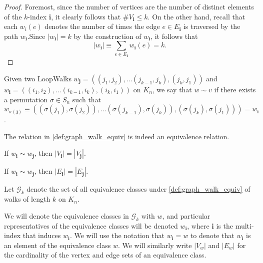 \begin{proof}
  Foremost, since the number of vertices
  are the number of distinct elements of the $k$-index $\mathbf{i}$, it clearly follows that $\#V_\mathbf{i} \leq k$.
  On the other hand, recall that each $w_i(e)$ denotes the number of times the edge $e \in E_\mathbf{i}$
  is traversed by the path $w_\mathbf{i}$.Since $|w_\mathbf{i}| = k$ by the construction of $w_\mathbf{i}$, it follows that
  \[
  |w_\mathbf{i}| \equiv \sum_{e \in E_\mathbf{i}} w_\mathbf{i}(e) = k.
  \]
\end{proof}


\begin{definition}
  \label{def:graph_walk_equiv}
  Given two LoopWalks $w_{\mathbf{j}} = ((j_1, j_2), \dots (j_{k-1}, j_k), (j_k, j_1))$ and
  $w_{\mathbf{i}}=((i_1, i_2), \dots (i_{k-1}, i_k), (i_k, i_1))$
   on $K_n$, we say that $w \sim v$ if there exists a permutation $\sigma \in S_n$ such that
   $w_{\sigma(\mathbf{j})} \equiv ((\sigma(j_1), \sigma(j_2)), \dots (\sigma(j_{k-1}), \sigma(j_k)), (\sigma(j_{k}), \sigma(j_1)))
   = w_{\mathbf{i}}$.
\end{definition}


\begin{lemma}
  \label{lem:graph_walk_equiv}
  The relation in \ref{def:graph_walk_equiv} is indeed an equivalence relation.
\end{lemma}


\begin{lemma}
  \label{lem:walk_vertex_card_equiv}
  If $w_{\mathbf{i}} \sim w_{\mathbf{j}}$, then $|V_{\mathbf{i}}| = |V_{\mathbf{j}}|$.
\end{lemma}


\begin{lemma}
  \label{lem:walk_edge_card_equiv}
  If $w_{\mathbf{i}} \sim w_{\mathbf{j}}$, then $|E_{\mathbf{i}}| = |E_{\mathbf{j}}|$.
\end{lemma}


\begin{definition}
  \label{def:g_k}
  Let $\mathcal{G}_k$ denote the set of all equivalence classes under \ref{def:graph_walk_equiv}
  of walks of length $k$ on $K_n$.
\end{definition}


We will denote the equivalence classes in $\mathcal{G}_k$ with $w$, and particular representatives
of the equivalence classes will be denoted $w_{\mathbf{i}}$, where $\mathbf{i}$ is the multi-index
that induces $w_\mathbf{i}$. We will use the notation that $w_{\mathbf{i}} = w$ to denote that
$w_{\mathbf{i}}$ is an element of the equivalence class $w$. We will similarly write $|V_w|$ and
$|E_w|$ for the cardinality of the vertex and edge sets of an equivalence class.


